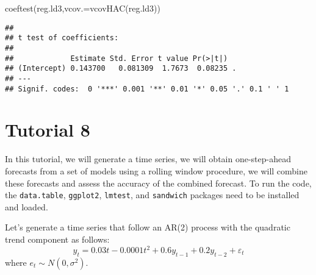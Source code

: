\documentclass[
  oneside]{book}
\newenvironment{Shaded}{\begin{snugshade}}{\end{snugshade}}
\newcommand{\AttributeTok}[1]{\textcolor[rgb]{0.77,0.63,0.00}{#1}}
\newcommand{\FunctionTok}[1]{\textcolor[rgb]{0.00,0.00,0.00}{#1}}
\newcommand{\NormalTok}[1]{#1}
\begin{document}
\begin{Shaded}
\begin{Highlighting}[]
\FunctionTok{coeftest}\NormalTok{(reg.ld3,}\AttributeTok{vcov.=}\FunctionTok{vcovHAC}\NormalTok{(reg.ld3))}
\end{Highlighting}
\end{Shaded}

\begin{verbatim}
## 
## t test of coefficients:
## 
##             Estimate Std. Error t value Pr(>|t|)  
## (Intercept) 0.143700   0.081309  1.7673  0.08235 .
## ---
## Signif. codes:  0 '***' 0.001 '**' 0.01 '*' 0.05 '.' 0.1 ' ' 1
\end{verbatim}

\hypertarget{tutorial-8}{%
\chapter*{Tutorial 8}\label{tutorial-8}}

In this tutorial, we will generate a time series, we will obtain one-step-ahead forecasts from a set of models using a rolling window procedure, we will combine these forecasts and assess the accuracy of the combined forecast. To run the code, the \texttt{data.table}, \texttt{ggplot2}, \texttt{lmtest}, and \texttt{sandwich} packages need to be installed and loaded.

Let's generate a time series that follow an AR(2) process with the quadratic trend component as follows:
\[y_t = 0.03t-0.0001t^2+0.6y_{t-1}+0.2y_{t-2}+\varepsilon_t\]
where \(e_{t} \sim N(0,\sigma^2)\).
\end{document}
